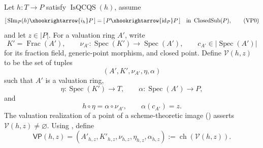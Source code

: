 \begin{definition}
  \label{def:nagata-dense-valuation-probe}
  \leanok

  Let $h\colon T\to P$ satisfy $\operatorname{IsQCQS}(h)$, assume
  \[
    [\,\operatorname{SIm}_P(h)\xhookrightarrow{i_h}P\,]
      =[\,P\xhookrightarrow{\operatorname{id}_P}P\,]
      \quad\text{in }\operatorname{ClosedSub}(P),                \tag{VP0}
  \]
  and let $z\in|P|$.  For a valuation ring $A'$,
  write
  \[
    K'=\operatorname{Frac}(A'),\qquad
    \nu_{A'}\colon\operatorname{Spec}(K')\to\operatorname{Spec}(A'),
    \qquad c_{A'}\in|\operatorname{Spec}(A')|
  \]
  for its fraction field, generic-point morphism, and closed point.  Define
  $\mathscr V(h,z)$ to be the set of tuples
  \[
    (A',K',\nu_{A'},\eta,\alpha)
  \]
  such that $A'$ is a valuation ring,
  \[
    \eta\colon\operatorname{Spec}(K')\to T,
    \qquad
    \alpha\colon\operatorname{Spec}(A')\to P,
  \]
  and
  \[
    h\circ\eta=\alpha\circ\nu_{A'},
    \qquad
    \alpha(c_{A'})=z.
  \]
  The valuation realization of a point of a scheme-theoretic image
  (\cite[\href{https://stacks.math.columbia.edu/tag/02JQ}{Tag 02JQ}]
  {stacks-project}) asserts
  $\mathscr V(h,z)\neq\varnothing$.  Using
  , define
  \[
    \mathsf{VP}(h,z)=
      (A'_{h,z},K'_{h,z},\nu_{h,z},\eta_{h,z},\alpha_{h,z})
      :=\operatorname{ch}(\mathscr V(h,z)).
  \]
\end{definition}


